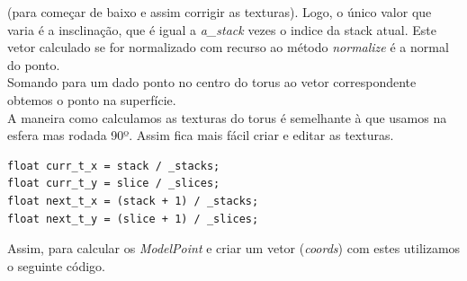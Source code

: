 \documentclass[a4paper]{report}
\begin{document}
(para começar de baixo e assim corrigir as texturas). Logo, o único valor que
varia é a insclinação, que é igual a \textit{a\_stack} vezes o indice da stack
atual. Este vetor calculado se for normalizado com recurso ao método
\textit{normalize} é a normal do ponto.\\
Somando para um dado ponto no centro do torus ao vetor correspondente obtemos o
ponto na superfície.\\
A maneira como calculamos as texturas do torus é semelhante à que usamos na
esfera  mas rodada 90º. Assim fica mais fácil criar e editar as texturas.\\
\begin{lstlisting}
float curr_t_x = stack / _stacks;
float curr_t_y = slice / _slices;
float next_t_x = (stack + 1) / _stacks;
float next_t_y = (slice + 1) / _slices;
\end{lstlisting}
Assim, para calcular os \textit{ModelPoint} e criar um vetor (\textit{coords})
com estes utilizamos o seguinte código.


\end{document}
